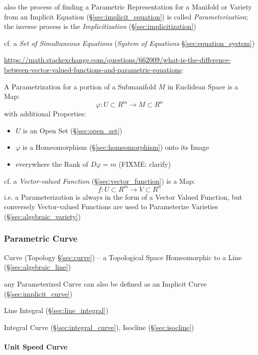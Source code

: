 also the process of finding a Parametric Representation for a Manifold or
Variety from an Implicit Equation (\S\ref{sec:implicit_equation}) is called
\emph{Parameterization}; the inverse process is the \emph{Implicitization}
(\S\ref{sec:implicitization})

cf. a \emph{Set of Simultaneous Equations} (\emph{System of Equations}
\S\ref{sec:equation_system})

\url{https://math.stackexchange.com/questions/662009/what-is-the-difference-between-vector-valued-functions-and-parametric-equations}:

A Parametrization for a portion of a Submanifold $M$ in Euclidean Space is a
Map:
\[
  \varphi : U \subset R^m \rightarrow M \subset R^n
\]
with additional Properties:
\begin{itemize}
  \item $U$ is an Open Set (\S\ref{sec:open_set})
  \item $\varphi$ is a Homeomorphism (\S\ref{sec:homeomorphism}) onto its Image
  \item everywhere the Rank of $D\varphi = m$ (FIXME: clarify)
\end{itemize}

\fist cf. a \emph{Vector-valued Function} (\S\ref{sec:vector_function}) is a
Map:
\[
  f : U \subset R^m \rightarrow V \subset R^n
\]
i.e. a Parameterization is always in the form of a Vector Valued Function, but
conversely Vector-valued Functions are used to Parameterize Varieties
(\S\ref{sec:algebraic_variety}) %



\subsubsection{Parametric Curve}\label{sec:parametric_curve}

\fist Curve (Topology \S\ref{sec:curve}) -- a Topological Space Homeomorphic to
a Line (\S\ref{sec:algebraic_line})

any Parameterized Curve can also be defined as an Implicit Curve
(\S\ref{sec:implicit_curve})

Line Integral (\S\ref{sec:line_integral})

Integral Curve (\S\ref{sec:integral_curve}), Isocline (\S\ref{sec:isocline})



\paragraph{Unit Speed Curve}\label{sec:unit_speed_curve}\hfill

